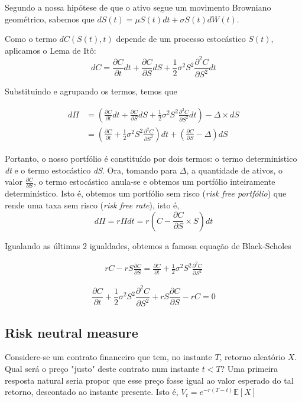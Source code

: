 \documentclass{article}
\begin{document}
Segundo a nossa hipótese de que o ativo segue um movimento Browniano geométrico, sabemos que $dS(t)=\mu S(t)dt+ \sigma S(t)dW(t)$. 

Como o termo $dC(S(t),t)$ depende de um processo estocástico $S(t)$, aplicamos o Lema de Itô:
\begin{equation*}
    dC=\frac{\partial C}{\partial t}dt+\frac{\partial C}{\partial S}dS+\frac{1}{2}\sigma^2 S^2\frac{\partial^2C}{\partial S^2}dt
\end{equation*}

Substituindo e agrupando os termos, temos que 

\begin{align*}
    d\Pi&=\left( \frac{\partial C}{\partial t}dt+\frac{\partial C}{\partial S}dS+\frac{1}{2}\sigma^2 S^2\frac{\partial^2C}{\partial S^2}dt \right)-\Delta \times dS\\
    &=\left( \frac{\partial C}{\partial t} + \frac{1}{2}\sigma^2 S^2\frac{\partial^2C}{\partial S^2}\right)dt+ \left( \frac{\partial C}{\partial S}-\Delta \right)dS
\end{align*}

\vspace{0.5cm}

Portanto, o nosso portfólio é constituído por dois termos: o termo determinístico \textit{dt} e o termo estocástico \textit{dS}. Ora, tomando para $\Delta$, a quantidade de ativos, o valor $\frac{\partial C}{\partial S}$, o termo estocástico anula-se e obtemos um portfólio inteiramente determinístico. Isto é, obtemos um portfólio sem risco (\textit{risk free portfólio}) que rende uma taxa sem risco (\textit{risk free rate}), isto é, 
$$d\Pi=r\Pi dt=r \left( C- \frac{\partial C}{\partial S} \times S \right)dt$$

Igualando as últimas 2 igualdades, obtemos a famosa equação de Black-Scholes

\begin{align*}
    rC- rS\frac{\partial C}{\partial S} =  \frac{\partial C}{\partial t} + \frac{1}{2}\sigma^2 S^2\frac{\partial^2C}{\partial S^2}
\end{align*}

$$\boxed{\frac{\partial C}{\partial t} + \frac{1}{2}\sigma^2 S^2\frac{\partial^2C}{\partial S^2}+rS\frac{\partial C}{\partial S}-rC=0}$$

\vspace{2cm}

\subsection{Risk neutral measure}
Considere-se um contrato financeiro que tem, no instante $T$, retorno aleatório $X$. Qual será o preço "justo" deste contrato num instante $t<T$? Uma primeira resposta natural seria propor que esse preço fosse igual ao valor esperado do tal retorno, descontado ao instante presente. Isto é, $V_t=e^{-r(T-t)}\mathbb{E}[X]$ 
\end{document}
